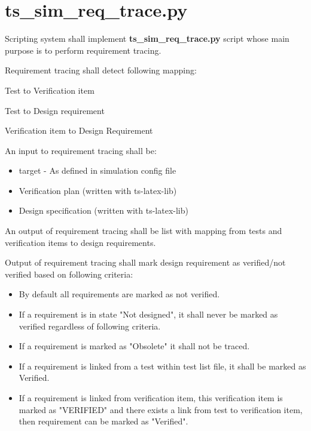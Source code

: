 \documentclass{tropic_design_spec}
\begin{document}
\ReqEnd


\pagebreak

\section{ts_sim_req_trace.py}



    {Scripting system shall implement \textbf{ts_sim_req_trace.py} script whose main 
     purpose is to perform requirement tracing.}

    {Requirement tracing shall detect following mapping:
    \begin{item}
        \item {Test to Verification item}
        \item {Test to Design requirement}
        \item {Verification item to Design Requirement}
    \end{item}
    }

    {An input to requirement tracing shall be:
        \begin{itemize}
            \item{target - As defined in simulation config file}
            \item{Verification plan (written with ts-latex-lib)}
            \item{Design specification (written with ts-latex-lib)}
        \end{itemize}
    }

    {An output of requirement tracing shall be list with mapping from tests and
     verification items to design requirements.
    }

    {Output of requirement tracing shall mark design requirement as verified/not
     verified based on following criteria:
     \begin{itemize}
         \item{By default all requirements are marked as not verified.}
         \item{If a requirement is in state "Not designed", it shall never be
               marked as verified regardless of following criteria.}
         \item{If a requirement is marked as "Obsolete" it shall not be traced.}
         \item{If a requirement is linked from a test within test list file,
               it shall be marked as Verified.}
         \item{If a requirement is linked from verification item, this verification
               item is marked as "VERIFIED" and there exists a link from test to
               verification item, then requirement can be marked as "Verified".}
     \end{itemize}
    }
\end{document}
